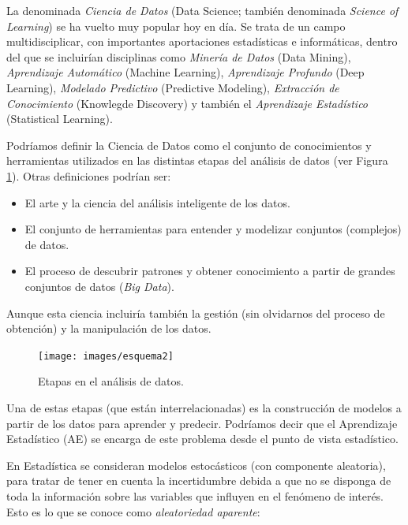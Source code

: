 \documentclass[
]{book}
\theoremstyle{break}
\theoremstyle{nonumberplain}
\begin{document}
La denominada \emph{Ciencia de Datos} (Data Science; también denominada \emph{Science of Learning}) se ha vuelto muy popular hoy en día.
Se trata de un campo multidisciplicar, con importantes aportaciones estadísticas e informáticas, dentro del que se incluirían disciplinas como \emph{Minería de Datos} (Data Mining), \emph{Aprendizaje Automático} (Machine Learning), \emph{Aprendizaje Profundo} (Deep Learning), \emph{Modelado Predictivo} (Predictive Modeling), \emph{Extracción de Conocimiento} (Knowlegde Discovery) y también el \emph{Aprendizaje Estadístico} (Statistical Learning).

Podríamos definir la Ciencia de Datos como el conjunto de conocimientos y herramientas utilizados en las distintas etapas del análisis de datos (ver Figura \ref{fig:esquema}).
Otras definiciones podrían ser:

\begin{itemize}
\item
  El arte y la ciencia del análisis inteligente de los datos.
\item
  El conjunto de herramientas para entender y modelizar conjuntos (complejos) de datos.
\item
  El proceso de descubrir patrones y obtener conocimiento a partir de grandes conjuntos de datos (\emph{Big Data}).
\end{itemize}

Aunque esta ciencia incluiría también la gestión (sin olvidarnos del proceso de obtención) y la manipulación de los datos.

\begin{figure}[!htb]

{\centering \texttt{[image: images/esquema2]} 

}

\caption{Etapas en el análisis de datos.}\label{fig:esquema}
\end{figure}

Una de estas etapas (que están interrelacionadas) es la construcción de modelos a partir de los datos para aprender y predecir.
Podríamos decir que el Aprendizaje Estadístico (AE) se encarga de este problema desde el punto de vista estadístico.

En Estadística se consideran modelos estocásticos (con componente aleatoria), para tratar de tener en cuenta la incertidumbre debida a que no se disponga de toda la información sobre las variables que influyen en el fenómeno de interés.
Esto es lo que se conoce como \emph{aleatoriedad aparente}:
\end{document}
